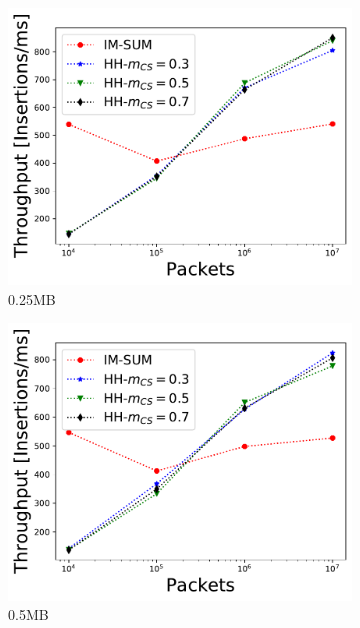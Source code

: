 \begin{figure}
\begin{subfigure}[t]{0.32\textwidth}
    \includegraphics[width=\linewidth]{HH/figures/throughput_per_pkts_m=0.25.pdf}
    \caption{0.25MB}
    \label{fig:fig4_d}
\end{subfigure}\hfill
\begin{subfigure}[t]{0.32\textwidth}
    \includegraphics[width=\linewidth]{HH/figures/throughput_per_pkts_m=0.5.pdf}
    \caption{0.5MB}
    \label{fig:fig4_e}
\end{subfigure}\hfill
\begin{subfigure}[t]{0.32\textwidth}

\end{subfigure}
\end{figure}
